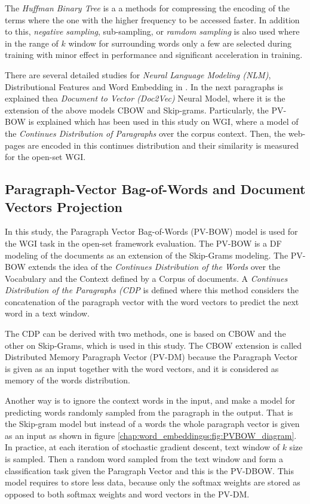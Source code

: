 The\textit{ Huffman Binary Tree} is a a methods for compressing the encoding of the terms where the one with the higher frequency to be accessed faster. In addition to this, \textit{negative sampling}, {sub-sampling}, or \textit{ramdom sampling} is also used where in the range of $k$ window for surrounding words only a few are selected during training with minor effect in  performance and significant acceleration in training. 

There are several detailed studies for \textit{Neural Language Modeling (NLM)}, Distributional Features and Word Embedding in \parencite{mitra2018introduction,mikolov2013efficient,mikolov2013distributed}. In the next paragraphs is explained thea \textit{Document to Vector (Doc2Vec)} Neural Model, where it is the extension of the above models CBOW and Skip-grams. Particularly, the PV-BOW is explained which has been used in this study on WGI, where a model of  the \textit{Continues Distribution of  Paragraphs} over the corpus context. Then, the web-pages are encoded in this continues distribution and their similarity is measured for the open-set WGI.
 
 
\subsection{Paragraph-Vector Bag-of-Words and Document Vectors Projection} \label{chap:word_embeddings:sec:PVBOW} 
 
In this study, the Paragraph Vector Bag-of-Words (PV-BOW) model is used for the WGI task in the open-set framework evaluation. The PV-BOW is a DF modeling of the documents as an extension of the Skip-Grams modeling. The PV-BOW extends the idea of the \textit{Continues Distribution of the Words} over the Vocabulary and the Context defined by a Corpus of documents. A \textit{Continues Distribution of the Paragraphs (CDP} is defined where this method considers the concatenation of the paragraph vector with the word vectors to predict the next word in a text window. 
 
The CDP can be derived with two methods, one is based on CBOW and the other on Skip-Grams, which is used in this study. The CBOW extension is called Distributed Memory Paragraph Vector (PV-DM) because the Paragraph Vector is given as an input together with the word vectors, and it is considered as memory of the words distribution.
 
Another way is to ignore the context words in the input, and make a model for predicting words randomly sampled from the paragraph in the output. That is the Skip-gram model but instead of a words the whole paragraph vector is given as an input as shown in figure \ref{chap:word_embeddingss:fig:PVBOW_diagram}. In practice, at each iteration of stochastic gradient descent, text window of $k$ size is sampled. Then a random word sampled from the text window and form a classification task given the Paragraph Vector and  this is the PV-DBOW. This model requires to store less data, because only the softmax weights are stored as opposed to both softmax weights and word vectors in the PV-DM. 

